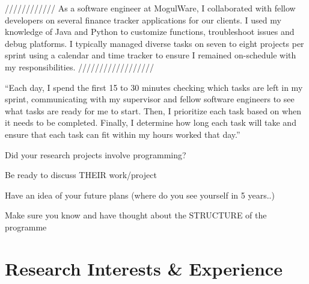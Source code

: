 \documentclass[11pt,aspectratio=169]{beamer}
\begin{document}
\begin{frame}{\underline{\secname}}
\begin{itemize}
////////////
As a software engineer at MogulWare, I collaborated with fellow developers on several finance tracker applications for our clients. I used my knowledge of Java and Python to customize functions, troubleshoot issues and debug platforms. I typically managed diverse tasks on seven to eight projects per sprint using a calendar and time tracker to ensure I remained on-schedule with my responsibilities.
//////////////////



“Each day, I spend the first 15 to 30 minutes checking which tasks are left in my sprint, communicating with my supervisor and fellow software engineers to see what tasks are ready for me to start. Then, I prioritize each task based on when it needs to be completed. Finally, I determine how long each task will take and ensure that each task can fit within my hours worked that day.”

Did your research projects involve programming?





Be ready to discuss THEIR work/project

Have an idea of your future plans (where do you see yourself in 5 years..)

Make sure you know and have thought about the STRUCTURE of the programme

		\end{itemize}

\end{frame}




\section{Research Interests \& Experience}
\end{document}

